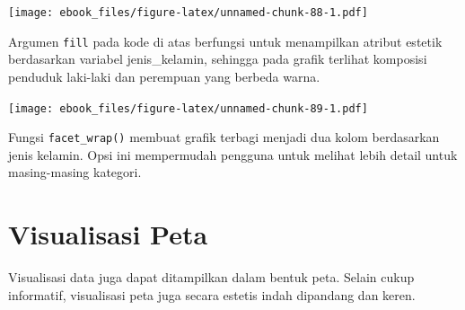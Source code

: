 \documentclass[openany]{book}
\newenvironment{Shaded}{\begin{snugshade}}{\end{snugshade}}
\newcommand{\KeywordTok}[1]{\textcolor[rgb]{0.13,0.29,0.53}{\textbf{#1}}}
\newcommand{\DataTypeTok}[1]{\textcolor[rgb]{0.13,0.29,0.53}{#1}}
\newcommand{\DecValTok}[1]{\textcolor[rgb]{0.00,0.00,0.81}{#1}}
\newcommand{\StringTok}[1]{\textcolor[rgb]{0.31,0.60,0.02}{#1}}
\newcommand{\OperatorTok}[1]{\textcolor[rgb]{0.81,0.36,0.00}{\textbf{#1}}}
\newcommand{\NormalTok}[1]{#1}
\begin{document}
\texttt{[image: ebook\_files/figure-latex/unnamed-chunk-88-1.pdf]}

Argumen \texttt{fill} pada kode di atas berfungsi untuk menampilkan
atribut estetik berdasarkan variabel jenis\_kelamin, sehingga pada
grafik terlihat komposisi penduduk laki-laki dan perempuan yang berbeda
warna.

\begin{Shaded}
\end{Shaded}

\texttt{[image: ebook\_files/figure-latex/unnamed-chunk-89-1.pdf]}

Fungsi \texttt{facet\_wrap()} membuat grafik terbagi menjadi dua kolom
berdasarkan jenis kelamin. Opsi ini mempermudah pengguna untuk melihat
lebih detail untuk masing-masing kategori.

\section{Visualisasi Peta}\label{visualisasi-peta}

Visualisasi data juga dapat ditampilkan dalam bentuk peta. Selain cukup
informatif, visualisasi peta juga secara estetis indah dipandang dan
keren.
\end{document}
